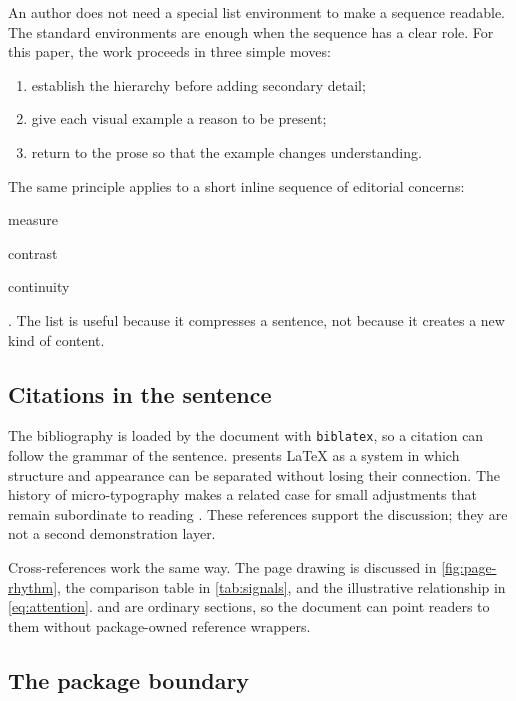 \documentclass[11pt]{article}
\begin{document}
An author does not need a special list environment to make a sequence readable.
The standard environments are enough when the sequence has a clear role.
For this paper, the work proceeds in three simple moves:

\begin{enumerate}
  \item establish the hierarchy before adding secondary detail;
  \item give each visual example a reason to be present;
  \item return to the prose so that the example changes understanding.
\end{enumerate}

The same principle applies to a short inline sequence of editorial concerns:
\begin{inlineitem}
  \item measure
  \item contrast
  \item continuity
\end{inlineitem}.
The list is useful because it compresses a sentence, not because it creates a
new kind of content.

\subsection{Citations in the sentence}
\label{subsec:citations}

The bibliography is loaded by the document with \texttt{biblatex}, so a
citation can follow the grammar of the sentence.
\textcite{mittelbach2004latex} presents LaTeX as a system in which structure
and appearance can be separated without losing their connection.
The history of micro-typography makes a related case for small adjustments that
remain subordinate to reading \autocite{thanh2000microtypography}.
These references support the discussion; they are not a second demonstration
layer.

Cross-references work the same way.
The page drawing is discussed in \cref{fig:page-rhythm}, the comparison table
in \cref{tab:signals}, and the illustrative relationship in
\cref{eq:attention}.
 and  are ordinary sections, so the
document can point readers to them without package-owned reference wrappers.

\subsection{The package boundary}
\label{subsec:boundary}
\end{document}
